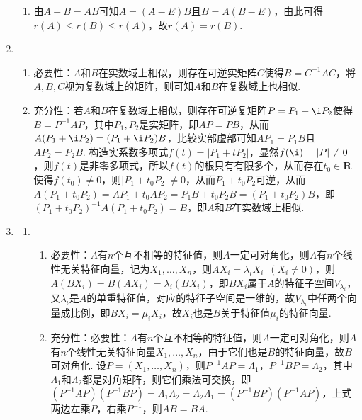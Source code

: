 \begin{enumerate}
\begin{enumerate}
              \item 由$A+B=AB$可知$A=(A-E)B$且$B=A(B-E)$，由此可得$r(A)\leqslant r(B)\leqslant r(A)$，故$r(A)=r(B)$.
          \end{enumerate}

    \item \begin{enumerate}
              \item 必要性：$A$和$B$在实数域上相似，则存在可逆实矩阵$C$使得$B=C^{-1}AC$，将$A,B,C$视为复数域上的矩阵，则可知$A$和$B$在复数域上也相似.

              \item 充分性：若$A$和$B$在复数域上相似，则存在可逆复矩阵$P=P_1+\i P_2$使得$B=P^{-1}AP$，其中$P_1,P_2$是实矩阵，即$AP=PB$，从而$A(P_1+\i P_2)=(P_1+\i P_2)B$，比较实部虚部可知$AP_1=P_1B$且$AP_2=P_2B$. 构造实系数多项式$f(t)=|P_1+tP_2|$，显然$f(\i)=|P|\neq 0$，则$f(t)$是非零多项式，所以$f(t)$的根只有有限多个，从而存在$t_0\in\mathbf{R}$使得$f(t_0)\neq 0$，则$|P_1+t_0P_2|\neq 0$，从而$P_1+t_0P_2$可逆，从而$A(P_1+t_0P_2)=AP_1+t_0AP_2=P_1B+t_0P_2B=(P_1+t_0P_2)B$，即$(P_1+t_0P_2)^{-1}A(P_1+t_0P_2)=B$，即$A$和$B$在实数域上相似.
          \end{enumerate}

    \item \label{ex:19:交换对角化}
          \begin{enumerate}
              \item \begin{enumerate}
                        \item 必要性：$A$有$n$个互不相等的特征值，则$A$一定可对角化，则$A$有$n$个线性无关特征向量，记为$X_1,\ldots,X_n$，则$AX_i=\lambda_iX_i\enspace (X_i\neq 0)$，则$A(BX_i)=B(AX_i)=\lambda_i(BX_i)$，即$BX_i$属于$A$的特征子空间$V_{\lambda_i}$，又$\lambda_i$是$A$的单重特征值，对应的特征子空间是一维的，故$V_{\lambda_i}$中任两个向量成比例，即$BX_i=\mu_iX_i$，故$X_i$也是$B$关于特征值$\mu_i$的特征向量.

                        \item 充分性：必要性：$A$有$n$个互不相等的特征值，则$A$一定可对角化，则$A$有$n$个线性无关特征向量$X_1,\ldots,X_n$，由于它们也是$B$的特征向量，故$B$可对角化. 设$P=(X_1,\ldots,X_n)$，则$P^{-1}AP=\varLambda_1$，$P^{-1}BP=\varLambda_2$，其中$\varLambda_1$和$\varLambda_2$都是对角矩阵，则它们乘法可交换，即$(P^{-1}AP)(P^{-1}BP)=\varLambda_1\varLambda_2=\varLambda_2\varLambda_1=(P^{-1}BP)(P^{-1}AP)$，上式两边左乘$P$，右乘$P^{-1}$，则$AB=BA$.
                    \end{enumerate}


\end{enumerate}
\end{enumerate}
